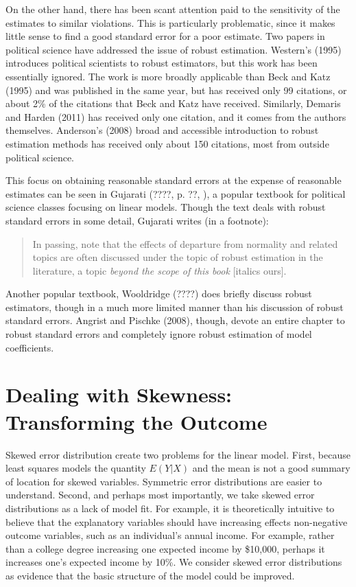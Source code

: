 \documentclass[12pt]{article}
\begin{document}
On the other hand, there has been scant attention paid to the sensitivity of the estimates to similar violations. This is particularly problematic, since it makes little sense to find a good standard error for a poor estimate. Two papers in political science have addressed the issue of robust estimation. Western's (1995) introduces political scientists to robust estimators, but this work has been essentially ignored. The work is more broadly applicable than Beck and Katz (1995) and was published in the same year, but has received only 99 citations, or  about 2\% of the citations that Beck and Katz have received. Similarly, Demaris and Harden (2011) has received only one citation, and it comes from the authors themselves. Anderson's (2008) broad and accessible introduction to robust estimation methods has received only about 150 citations, most from outside political science.

This focus on obtaining reasonable standard errors at the expense of reasonable estimates can be seen in Gujarati (????, p. ??, ), a popular textbook for political science classes focusing on linear models. Though the text deals with robust standard errors in some detail, Gujarati writes (in a footnote):
\begin{quote}
In passing, note that the effects of departure from normality and related topics are often discussed under the topic of robust estimation in the literature, a topic \textit{beyond the scope of this book} [italics ours].
\end{quote}
Another popular textbook, Wooldridge (????) does briefly discuss robust estimators, though in a much more limited manner than his discussion of robust standard errors. Angrist and Pischke (2008), though, devote an entire chapter to robust standard errors and completely ignore robust estimation of model coefficients.

\section*{Dealing with Skewness: Transforming the Outcome}

Skewed error distribution create two problems for the linear model. First, because least squares models the quantity $E(Y | X)$ and the mean is not a good summary of location for skewed variables. Symmetric error distributions are easier to understand. Second, and perhaps most importantly, we take skewed error distributions as a lack of model fit. For example, it is theoretically intuitive to believe that the explanatory variables should have increasing effects non-negative outcome variables, such as an individual's annual income. For example, rather than a college degree increasing one expected income by \$10,000, perhaps it increases one's expected income by 10\%. We consider skewed error distributions as evidence that the basic structure of the model could be improved.
\end{document}
